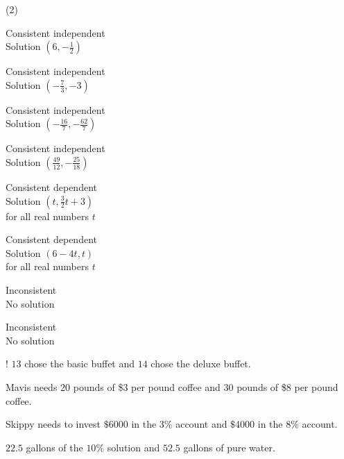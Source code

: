 \begin{tasks}(2)

\task Consistent independent \\
Solution $\left(6, -\frac{1}{2}\right)$

\task Consistent independent \\
Solution $\left(-\frac{7}{3}, -3\right)$ 

\task  Consistent independent \\
Solution $\left(-\frac{16}{7}, -\frac{62}{7}\right)$  

\task Consistent independent \\
Solution $\left(\frac{49}{12}, -\frac{25}{18}\right)$

\task  Consistent dependent\\
Solution $\left(t, \frac{3}{2}t+3\right)$ \\
for all real numbers $t$

\task  Consistent dependent\\
Solution $\left(6-4t, t\right)$ \\
for all real numbers $t$

\task  Inconsistent \\
No solution

\task   Inconsistent \\
No solution

\task!  $13$ chose the basic buffet and $14$ chose the deluxe buffet.

\task Mavis needs 20 pounds of \$3 per pound coffee and 30 pounds of \$8 per pound coffee.

\task  Skippy needs to invest $\$$6000 in the $3\%$ account and $\$$4000 in the $8 \%$ account.

\task  $22.5$ gallons of the $10 \%$ solution and $52.5$ gallons of pure water.

\end{tasks}

